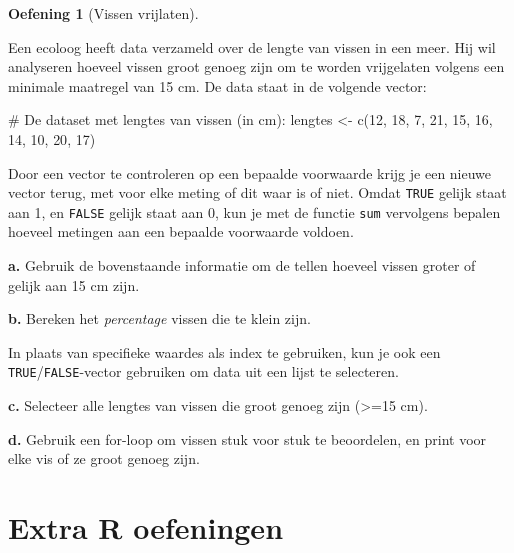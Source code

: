 \documentclass[
  a4paper,
]{scrbook}
\newenvironment{Shaded}{\begin{snugshade}}{\end{snugshade}}
\newcommand{\CommentTok}[1]{\textcolor[rgb]{0.37,0.37,0.37}{#1}}
\newcommand{\DecValTok}[1]{\textcolor[rgb]{0.68,0.00,0.00}{#1}}
\newcommand{\FunctionTok}[1]{\textcolor[rgb]{0.28,0.35,0.67}{#1}}
\newcommand{\NormalTok}[1]{\textcolor[rgb]{0.00,0.23,0.31}{#1}}
\newcommand{\OtherTok}[1]{\textcolor[rgb]{0.00,0.23,0.31}{#1}}
\theoremstyle{definition}
\newtheorem{exercise}{Oefening}[chapter]
\theoremstyle{remark}
\begin{document}
\begin{exercise}[Vissen
vrijlaten]\protect\hypertarget{exr-vislengtes}{}\label{exr-vislengtes}

Een ecoloog heeft data verzameld over de lengte van vissen in een meer.
Hij wil analyseren hoeveel vissen groot genoeg zijn om te worden
vrijgelaten volgens een minimale maatregel van 15 cm. De data staat in
de volgende vector:

\begin{Shaded}
\begin{Highlighting}[]
\CommentTok{\# De dataset met lengtes van vissen (in cm):}
\NormalTok{lengtes }\OtherTok{\textless{}{-}} \FunctionTok{c}\NormalTok{(}\DecValTok{12}\NormalTok{, }\DecValTok{18}\NormalTok{, }\DecValTok{7}\NormalTok{, }\DecValTok{21}\NormalTok{, }\DecValTok{15}\NormalTok{, }\DecValTok{16}\NormalTok{, }\DecValTok{14}\NormalTok{, }\DecValTok{10}\NormalTok{, }\DecValTok{20}\NormalTok{, }\DecValTok{17}\NormalTok{)}
\end{Highlighting}
\end{Shaded}

Door een vector te controleren op een bepaalde voorwaarde krijg je een
nieuwe vector terug, met voor elke meting of dit waar is of niet. Omdat
\texttt{TRUE} gelijk staat aan 1, en \texttt{FALSE} gelijk staat aan 0,
kun je met de functie \texttt{sum} vervolgens bepalen hoeveel metingen
aan een bepaalde voorwaarde voldoen.

\textbf{a.} Gebruik de bovenstaande informatie om de tellen hoeveel
vissen groter of gelijk aan 15 cm zijn.

\textbf{b.} Bereken het \emph{percentage} vissen die te klein zijn.

In plaats van specifieke waardes als index te gebruiken, kun je ook een
\texttt{TRUE}/\texttt{FALSE}-vector gebruiken om data uit een lijst te
selecteren.

\textbf{c.} Selecteer alle lengtes van vissen die groot genoeg zijn
(\textgreater=15 cm).

\textbf{d.} Gebruik een for-loop om vissen stuk voor stuk te beoordelen,
en print voor elke vis of ze groot genoeg zijn.

\end{exercise}

\chapter{Extra R oefeningen}\label{sec-Rquestions}
\end{document}
